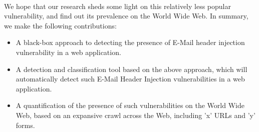 \paragraph{} %
We hope that our research sheds some light on this relatively less popular vulnerability, and find out its prevalence on the World Wide Web. In summary, we make the following contributions:
\begin{itemize}
	
	\item{A black-box approach to detecting the presence of E-Mail header injection vulnerability in a web application.}
	
	\item{A detection and classification tool based on the above approach, which will automatically detect such E-Mail Header Injection vulnerabilities in a web application.}
	
	\item{A quantification of the presence of such vulnerabilities on the World Wide Web, based on an expansive crawl across the Web, including {'x'} URLs and {'y'} forms.}
	
\end{itemize}

\paragraph{}